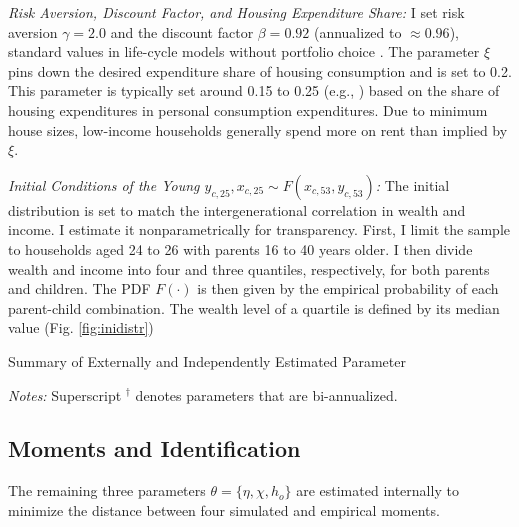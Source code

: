 \documentclass[12pt]{article}
\begin{document}

\textit{Risk Aversion, Discount Factor, and Housing Expenditure Share:} I set risk aversion $\gamma=2.0$ and the discount factor $\beta=0.92$ (annualized to $\approx0.96$), standard values in life-cycle models without portfolio choice \citep[see e.g.,][]{Kaplan2020,Boar2018}. The parameter $\xi$ pins down the desired expenditure share of housing consumption and is set to 0.2. This parameter is typically set around 0.15 to 0.25 (e.g., \citealp{Kaplan2020,Chatterjee2015,Paz-Pardo2019,davis2011household}) based on the share of housing expenditures in personal consumption expenditures. Due to minimum house sizes, low-income households generally spend more on rent than implied by $\xi$.


\textit{Initial Conditions of the Young $y_{c,25},x_{c,25}\sim F(x_{c,53},y_{c,53})$:} 
The initial distribution is set to match the intergenerational correlation in wealth and income. I estimate it nonparametrically for transparency. First, I limit the sample to households aged 24 to 26 with parents 16 to 40 years older. I then divide wealth and income into four and three quantiles, respectively, for both parents and children. The PDF $F(\cdot)$ is then given by the empirical probability of each parent-child combination. The wealth level of a quartile is defined by its median value (Fig. \ref{fig:inidistr})

 
\begin{table}
	\center
	\begin{threeparttable}
		\caption{Summary of Externally and Independently Estimated Parameter}\label{tab:calpar}
		\small
		
		\footnotesize
		\textit{Notes:} Superscript $^\dagger$ denotes parameters that are bi-annualized.
	\end{threeparttable}
\end{table}


\subsection{Moments and Identification}
The remaining three parameters $\theta=\{\eta,\chi,h_o\}$ are estimated internally to minimize the distance between four simulated and empirical moments. 
\end{document}
